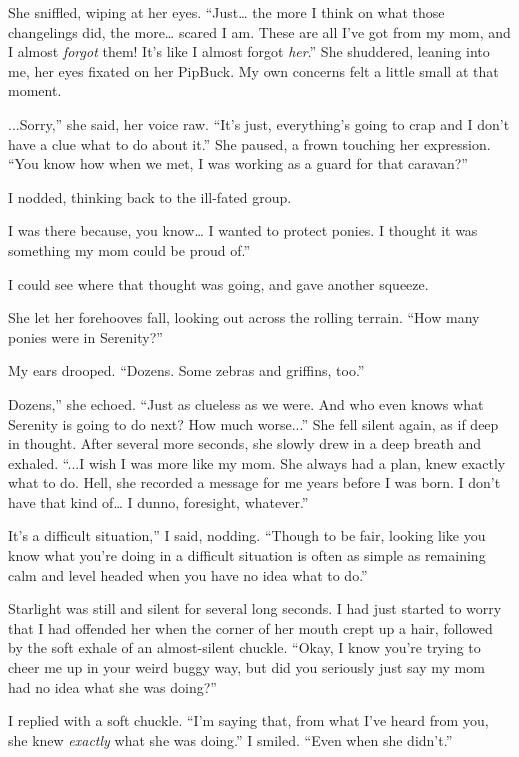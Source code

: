 She sniffled, wiping at her eyes. “Just… the more I think on what those changelings did, the more… scared I am. These are all I’ve got from my mom, and I almost \textit{forgot} them! It’s like I almost forgot \textit{her}.” She shuddered, leaning into me, her eyes fixated on her PipBuck. My own concerns felt a little small at that moment.

\leavevmode{}...Sorry,” she said, her voice raw. “It’s just, everything’s going to crap and I don’t have a clue what to do about it.” She paused, a frown touching her expression. “You know how when we met, I was working as a guard for that caravan?”

I nodded, thinking back to the ill-fated group.

\leavevmode{}I was there because, you know… I wanted to protect ponies. I thought it was something my mom could be proud of.”

I could see where that thought was going, and gave another squeeze.

She let her forehooves fall, looking out across the rolling terrain. “How many ponies were in Serenity?”

My ears drooped. “Dozens. Some zebras and griffins, too.”

\leavevmode{}Dozens,” she echoed. “Just as clueless as we were. And who even knows what Serenity is going to do next? How much worse...” She fell silent again, as if deep in thought. After several more seconds, she slowly drew in a deep breath and exhaled. “...I wish I was more like my mom. She always had a plan, knew exactly what to do. Hell, she recorded a message for me years before I was born. I don’t have that kind of… I dunno, foresight, whatever.”

\leavevmode{}It’s a difficult situation,” I said, nodding. “Though to be fair, looking like you know what you’re doing in a difficult situation is often as simple as remaining calm and level headed when you have no idea what to do.”

Starlight was still and silent for several long seconds. I had just started to worry that I had offended her when the corner of her mouth crept up a hair, followed by the soft exhale of an almost-silent chuckle. “Okay, I know you’re trying to cheer me up in your weird buggy way, but did you seriously just say my mom had no idea what she was doing?”

I replied with a soft chuckle. “I’m saying that, from what I’ve heard from you, she knew \textit{exactly} what she was doing.” I smiled. “Even when she didn’t.”

